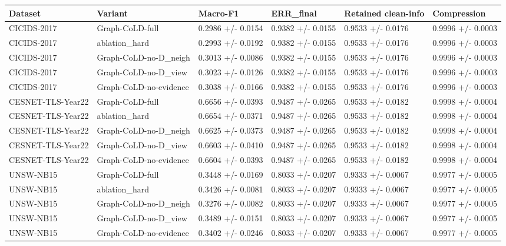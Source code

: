 \small
\begin{tabular}{llllll}
\hline
Dataset & Variant & Macro-F1 & ERR\_final & Retained clean-info & Compression \\
\hline
CICIDS-2017 & Graph-CoLD-full & 0.2986 +/- 0.0154 & 0.9382 +/- 0.0155 & 0.9533 +/- 0.0176 & 0.9996 +/- 0.0003 \\
CICIDS-2017 & ablation\_hard & 0.2993 +/- 0.0192 & 0.9382 +/- 0.0155 & 0.9533 +/- 0.0176 & 0.9996 +/- 0.0003 \\
CICIDS-2017 & Graph-CoLD-no-D\_neigh & 0.3013 +/- 0.0086 & 0.9382 +/- 0.0155 & 0.9533 +/- 0.0176 & 0.9996 +/- 0.0003 \\
CICIDS-2017 & Graph-CoLD-no-D\_view & 0.3023 +/- 0.0126 & 0.9382 +/- 0.0155 & 0.9533 +/- 0.0176 & 0.9996 +/- 0.0003 \\
CICIDS-2017 & Graph-CoLD-no-evidence & 0.3038 +/- 0.0166 & 0.9382 +/- 0.0155 & 0.9533 +/- 0.0176 & 0.9996 +/- 0.0003 \\
CESNET-TLS-Year22 & Graph-CoLD-full & 0.6656 +/- 0.0393 & 0.9487 +/- 0.0265 & 0.9533 +/- 0.0182 & 0.9998 +/- 0.0004 \\
CESNET-TLS-Year22 & ablation\_hard & 0.6654 +/- 0.0371 & 0.9487 +/- 0.0265 & 0.9533 +/- 0.0182 & 0.9998 +/- 0.0004 \\
CESNET-TLS-Year22 & Graph-CoLD-no-D\_neigh & 0.6625 +/- 0.0373 & 0.9487 +/- 0.0265 & 0.9533 +/- 0.0182 & 0.9998 +/- 0.0004 \\
CESNET-TLS-Year22 & Graph-CoLD-no-D\_view & 0.6603 +/- 0.0410 & 0.9487 +/- 0.0265 & 0.9533 +/- 0.0182 & 0.9998 +/- 0.0004 \\
CESNET-TLS-Year22 & Graph-CoLD-no-evidence & 0.6604 +/- 0.0393 & 0.9487 +/- 0.0265 & 0.9533 +/- 0.0182 & 0.9998 +/- 0.0004 \\
UNSW-NB15 & Graph-CoLD-full & 0.3448 +/- 0.0169 & 0.8033 +/- 0.0207 & 0.9333 +/- 0.0067 & 0.9977 +/- 0.0005 \\
UNSW-NB15 & ablation\_hard & 0.3426 +/- 0.0081 & 0.8033 +/- 0.0207 & 0.9333 +/- 0.0067 & 0.9977 +/- 0.0005 \\
UNSW-NB15 & Graph-CoLD-no-D\_neigh & 0.3276 +/- 0.0082 & 0.8033 +/- 0.0207 & 0.9333 +/- 0.0067 & 0.9977 +/- 0.0005 \\
UNSW-NB15 & Graph-CoLD-no-D\_view & 0.3489 +/- 0.0151 & 0.8033 +/- 0.0207 & 0.9333 +/- 0.0067 & 0.9977 +/- 0.0005 \\
UNSW-NB15 & Graph-CoLD-no-evidence & 0.3402 +/- 0.0246 & 0.8033 +/- 0.0207 & 0.9333 +/- 0.0067 & 0.9977 +/- 0.0005 \\
\hline
\end{tabular}
